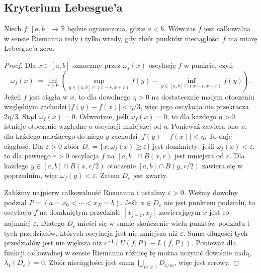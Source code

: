 \subsection{Kryterium Lebesgue'a}
\begin{twierdzenie}
\label{thm:riemann-criterion}
Niech $f:[a,b]\to\mathbb R$ będzie ograniczona, gdzie
$a<b$. Wówczas $f$ jest całkowalna w sensie Riemanna
tedy i tylko wtedy, gdy zbiór punktów nieciągłości $f$
ma miarę Lebesgue'a zero.
\end{twierdzenie}
\begin{proof}
Dla $x\in[a,b]$ oznaczmy przez $\omega_f(x)$
oscylację $f$ w punkcie, czyli
\[
\omega_f(x):=\inf_{r>0}
\left(\sup_{y\in[a,b]\cap(x-r,x+r)}f(y)
-\inf_{y\in[a,b]\cap(x-r,x+r)}f(y)\right).
\]
Jeżeli $f$ jest ciągła w $x$, to dla dowolnego $\eta>0$ na dostatecznie małym otoczeniu względnym zachodzi $|f(y)-f(x)|<\eta/3$, więc jego oscylacja nie przekracza $2\eta/3$. Stąd $\omega_f(x)=0$. Odwrotnie, jeśli $\omega_f(x)=0$, to dla każdego $\eta>0$ istnieje otoczenie względne o oscylacji mniejszej od $\eta$. Ponieważ zawiera ono $x$, dla każdego należącego do niego $y$ zachodzi $|f(y)-f(x)|<\eta$. To daje ciągłość. Dla $\varepsilon>0$ zbiór
$D_\varepsilon=\{x:\omega_f(x)\ge\varepsilon\}$
jest domknięty: jeśli $\omega_f(x)<\varepsilon$,
to dla pewnego $r>0$ oscylacja $f$ na $[a,b]\cap B(x,r)$ jest mniejsza od $\varepsilon$. Dla każdego $y\in[a,b]\cap B(x,r/2)$ otoczenie $[a,b]\cap B(y,r/2)$ zawiera się w poprzednim, więc $\omega_f(y)<\varepsilon$. Zatem $D_\varepsilon$ jest zwarty.

Załóżmy najpierw całkowalność Riemanna i
ustalmy $\varepsilon>0$. Weźmy dowolny podział
$P=(a=x_0<\cdots<x_N=b)$. Jeśli
$x\in D_\varepsilon$ nie jest punktem podziału,
to oscylacja $f$ na domkniętym przedziale
$[x_{j-1},x_j]$ zawierającym $x$ jest co najmniej
$\varepsilon$. Dlatego $D_\varepsilon$ mieści się
w sumie skończenie wielu punktów podziału i tych
przedziałów, których oscylacja jest nie mniejsza
niż $\varepsilon$. Suma długości tych przedziałów
jest nie większa niż
$\varepsilon^{-1}(U(f,P)-L(f,P))$.
Ponieważ dla funkcji całkowalnej w sensie Riemanna
różnicę tę można uczynić dowolnie małą,
$\lambda_1(D_\varepsilon)=0$.
Zbiór nieciągłości jest sumą
$\bigcup_{m\ge1}D_{1/m}$, więc jest zerowy.


\end{proof}
